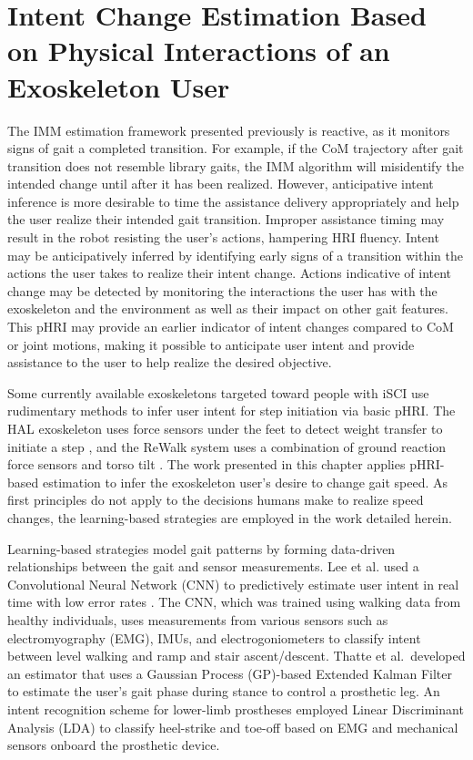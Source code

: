 \chapter{Intent Change Estimation Based on Physical Interactions of an	Exoskeleton User}\label{chapter:BKF}

The IMM estimation framework presented previously is reactive, as it monitors signs of gait a completed transition. For example, if the CoM trajectory after gait transition does not resemble library gaits, the IMM algorithm will misidentify the intended change until after it has been realized. However, anticipative intent inference is more desirable to time the assistance delivery appropriately and help the user realize their intended gait transition. Improper assistance timing may result in the robot resisting the user's actions, hampering HRI fluency. Intent may be anticipatively inferred by identifying early signs of a transition within the actions the user takes to realize their intent change. Actions indicative of intent change may be detected by monitoring the interactions the user has with the exoskeleton and the environment as well as their impact on other gait features. This pHRI may provide an earlier indicator of intent changes compared to CoM or joint motions, making it possible to anticipate user intent and provide assistance to the user to help realize the desired objective. 

Some currently available exoskeletons targeted toward people with iSCI use rudimentary methods to infer user intent for step initiation via basic pHRI. The HAL exoskeleton uses force sensors under the feet to detect weight transfer to initiate a step \cite{suzuki2007intention}, and the ReWalk system uses a combination of ground reaction force sensors and torso tilt \cite{goffer2012locomotion}. The work presented in this chapter applies pHRI-based estimation to infer the exoskeleton user's desire to change gait speed. As first principles do not apply to the decisions humans make to realize speed changes, the learning-based strategies are employed in the work detailed herein.

Learning-based strategies model gait patterns by forming data-driven relationships between the gait and sensor measurements. Lee et al. used a Convolutional Neural Network (CNN) to predictively estimate user intent in real time with low error rates \cite{lee2020image}. The CNN, which was trained using walking data from healthy individuals, uses measurements from various sensors such as electromyography (EMG), IMUs, and electrogoniometers to classify intent between level walking and ramp and stair ascent/descent. Thatte et al.~developed an estimator that uses a Gaussian Process (GP)-based Extended Kalman Filter \cite{thatte2019robust} to estimate the user's gait phase during stance to control a prosthetic leg. An intent recognition scheme for lower-limb prostheses \cite{young2013classifying} employed Linear Discriminant Analysis (LDA) to classify heel-strike and toe-off based on EMG and mechanical sensors onboard the prosthetic device. 

